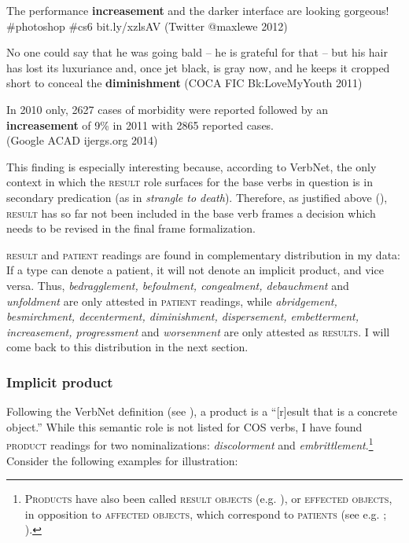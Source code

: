 \begin{exe}
  \ex 
  \begin{xlist}
  \item \label{ex:cos.res1} The performance \textbf{increasement} and the darker interface are looking gorgeous! \#photoshop \#cs6 bit.ly/xzlsAV {\small(Twitter @maxlewe 2012)}
  \item \label{ex:cos.res2} No one could say that he was going bald -- he is grateful for that -- but his hair has lost its luxuriance and, once jet black, is gray now, and he keeps it cropped short to conceal the \textbf{diminishment} 
  {\small(\acs{COCA} FIC Bk:LoveMyYouth 2011)}
  \item \label{ex:cos.res3} In 2010 only, 2627 cases of morbidity were reported followed by an \textbf{increasement} of 9\% in 2011 with 2865 reported cases. \\ 
  {\small(Google ACAD ijergs.org 2014)}
  \end{xlist}
\end{exe}


\noindent This finding is especially interesting because, according to VerbNet, the only context in which the \textsc{result} role surfaces for the base verbs in question is in secondary predication (as in \textit{strangle to death}). Therefore, as justified above (), \textsc{result} has so far not been included in the base verb frames  \textendash{}  a decision which needs to be revised in the final frame formalization.

\textsc{result} and \textsc{patient} readings are found in complementary distribution in my data: If a type can denote a patient, it will not denote an implicit product, and vice versa. Thus, \textit{bedragglement, befoulment, congealment, debauchment} and \textit{unfoldment} are only attested in \textsc{patient} readings, while \textit{abridgement, besmirchment, decenterment, diminishment, dispersement, embetterment, increasement, progressment} and \textit{worsenment} are only attested as \textsc{results}.
I will come back to this distribution in the next section.

\subsubsection{{Implicit product}}

Following the VerbNet definition (see \citealt[319]{Palmer.2017}), a product is a ``[r]esult that is a concrete object.'' While this semantic role is not listed for COS verbs, I have found \textsc{product} readings for two nominalizations: \textit{discolorment} and \textit{embrittlement}.\footnote{\textsc{Products} have also been called \textsc{result objects} (e.g. \citealt{Schulzek.forthcoming}), or \textsc{effected objects},  in opposition to \textsc{affected objects}, which correspond to \textsc{patients} (see e.g. \citealt[343]{Motsch.1999}; \citealt{Hopper.1985}).} Consider the following examples for illustration:

